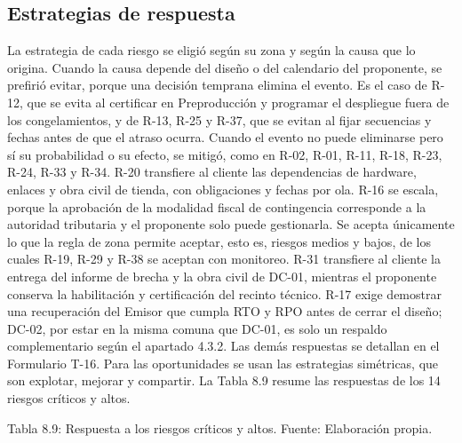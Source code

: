 \documentclass[11pt]{article}
\begin{document}
\subsection{Estrategias de respuesta}

La estrategia de cada riesgo se eligió según su zona y según la causa que lo origina. Cuando la causa depende del diseño o del calendario del proponente, se prefirió evitar, porque una decisión temprana elimina el evento. Es el caso de R-12, que se evita al certificar en Preproducción y programar el despliegue fuera de los congelamientos, y de R-13, R-25 y R-37, que se evitan al fijar secuencias y fechas antes de que el atraso ocurra. Cuando el evento no puede eliminarse pero sí su probabilidad o su efecto, se mitigó, como en R-02, R-01, R-11, R-18, R-23, R-24, R-33 y R-34. R-20 transfiere al cliente las dependencias de hardware, enlaces y obra civil de tienda, con obligaciones y fechas por ola. R-16 se escala, porque la aprobación de la modalidad fiscal de contingencia corresponde a la autoridad tributaria y el proponente solo puede gestionarla. Se acepta únicamente lo que la regla de zona permite aceptar, esto es, riesgos medios y bajos, de los cuales R-19, R-29 y R-38 se aceptan con monitoreo. R-31 transfiere al cliente la entrega del informe de brecha y la obra civil de DC-01, mientras el proponente conserva la habilitación y certificación del recinto técnico. R-17 exige demostrar una recuperación del Emisor que cumpla RTO y RPO antes de cerrar el diseño; DC-02, por estar en la misma comuna que DC-01, es solo un respaldo complementario según el apartado 4.3.2. Las demás respuestas se detallan en el Formulario T-16. Para las oportunidades se usan las estrategias simétricas, que son explotar, mejorar y compartir. La Tabla 8.9 resume las respuestas de los 14 riesgos críticos y altos.

Tabla 8.9: Respuesta a los riesgos críticos y altos. Fuente: Elaboración propia.\label{tab:8-9}
\end{document}
